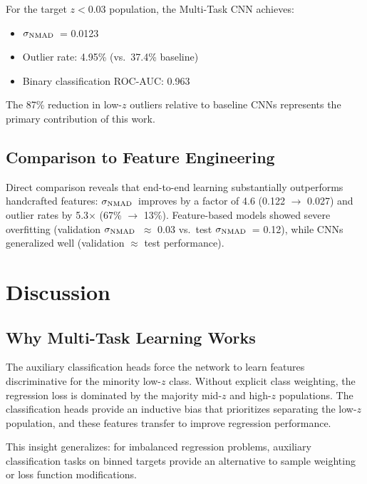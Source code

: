 \documentclass[linenumbers,twocolumn]{aastex7}
\newcommand{\sigmaNMAD}{\ensuremath{\sigma_{\rm NMAD}}}
\begin{document}
For the target $z < 0.03$ population, the Multi-Task CNN achieves:
\begin{itemize}
    \item \sigmaNMAD\ = 0.0123
    \item Outlier rate: 4.95\% (vs.\ 37.4\% baseline)
    \item Binary classification ROC-AUC: 0.963
\end{itemize}

The 87\% reduction in low-$z$ outliers relative to baseline CNNs represents 
the primary contribution of this work.

\subsection{Comparison to Feature Engineering}

Direct comparison reveals that end-to-end learning substantially outperforms 
handcrafted features: \sigmaNMAD\ improves by a factor of 4.6 (0.122 $\to$ 0.027) 
and outlier rates by 5.3$\times$ (67\% $\to$ 13\%). Feature-based models showed 
severe overfitting (validation \sigmaNMAD\ $\approx$ 0.03 vs.\ test \sigmaNMAD\ = 
0.12), while CNNs generalized well (validation $\approx$ test performance).

\section{Discussion}
\label{sec:discussion}

\subsection{Why Multi-Task Learning Works}

The auxiliary classification heads force the network to learn features 
discriminative for the minority low-$z$ class. Without explicit class weighting, 
the regression loss is dominated by the majority mid-$z$ and high-$z$ populations. 
The classification heads provide an inductive bias that prioritizes separating 
the low-$z$ population, and these features transfer to improve regression 
performance.

This insight generalizes: for imbalanced regression problems, auxiliary 
classification tasks on binned targets provide an alternative to sample 
weighting or loss function modifications.
\end{document}
